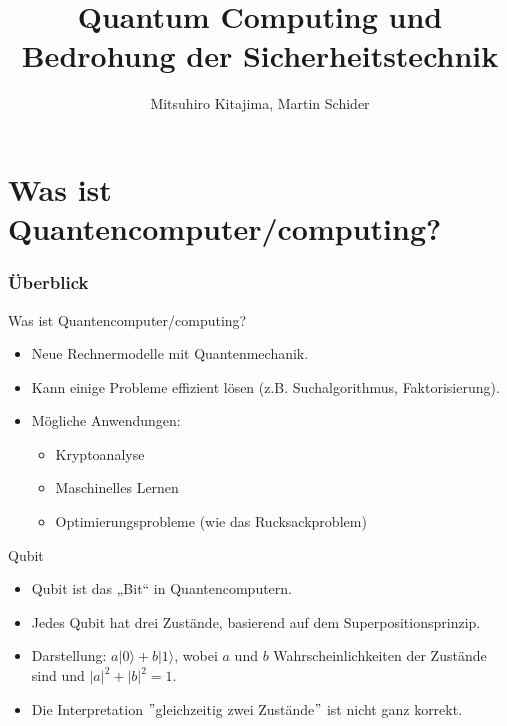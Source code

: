 \documentclass{beamer}
\title{Quantum Computing und Bedrohung der Sicherheitstechnik}
\author{Mitsuhiro Kitajima, Martin Schider}
\institute{Paris Lodron University of Salzburg}
\date{}
\begin{document}
    \begin{frame}
        \titlepage
    \end{frame}


    \section{Was ist Quantencomputer/computing?}

    \begin{frame}
        \frametitle{Überblick}
        \tableofcontents
    \end{frame}

    \begin{frame}{Was ist Quantencomputer/computing?}
        \begin{itemize}
            \item Neue Rechnermodelle mit Quantenmechanik.
            \item Kann einige Probleme effizient lösen (z.B. Suchalgorithmus, Faktorisierung).
            \item Mögliche Anwendungen:
            \begin{itemize}
                \item Kryptoanalyse
                \item Maschinelles Lernen
                \item Optimierungsprobleme (wie das Rucksackproblem)
            \end{itemize}
        \end{itemize}
    \end{frame}

    \begin{frame}{Qubit}
        \begin{itemize}
            \item Qubit ist das „Bit“ in Quantencomputern.
            \item Jedes Qubit hat drei Zustände, basierend auf dem Superpositionsprinzip.
            \item Darstellung: \( a | 0 \rangle + b | 1 \rangle \), wobei \( a \) und \( b \) Wahrscheinlichkeiten der Zustände sind und \( |a|^2 + |b|^2 = 1 \).
            \item Die Interpretation \("\)gleichzeitig zwei Zustände\("\) ist nicht ganz korrekt.
        \end{itemize}
    \end{frame}
\end{document}
